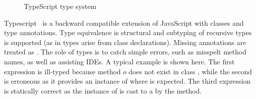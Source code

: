 \documentclass[acmlarge, anonymous, authordraft]{acmart}
\begin{document}
\begin{figure}
\hrulefill
\begin{mathpar}










\end{mathpar}

\hrulefill
\caption{TypeScript type system}\label{f:typescriptts}
\end{figure}


Typescript~\cite{BAT14} is a backward compatible extension of JavaScript
with classes and type annotations. Type equivalence is structural and
subtyping of recursive types is supported (as in \kafka types arise from class
declarations). Missing annotations are treated as \any. The role of types is
to catch simple errors, such as misspelt method names, as well as assisting
IDEs.  A typical example is shown here. The first expression is ill-typed
because method \(o\) does not exist in class \C, while the second is erroneous as it
provides an instance of \C where \D is expected. The third
expression is statically correct as the instance of \C is cast to a
\D by the \n method.
%
\end{document}
